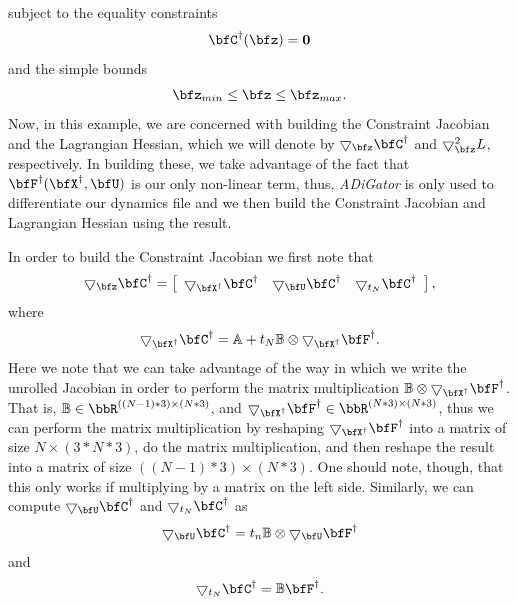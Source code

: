 \documentclass[10pt,pdftex]{article}
\begin{document}
subject to the equality constraints
\begin{equation}
\bfC^{\dag}(\bfz) = \bf0
\end{equation}
and the simple bounds
\begin{equation}
\bfz_{min} \leq \bfz \leq \bfz_{max}.
\end{equation}
Now, in this example, we are concerned with building the Constraint Jacobian and the Lagrangian Hessian, which we will denote by $\bigtriangledown _{\bfz} \bfC^{\dag}$ and $\bigtriangledown^2 _{\bfz} L$, respectively. In building these, we take advantage of the fact that $\bfF^{\dag}(\bfX^\dag,\bfU)$ is our only non-linear term, thus, \emph{ADiGator} is only used to differentiate our dynamics file and we then build the Constraint Jacobian and Lagrangian Hessian using the result.

In order to build the Constraint Jacobian we first note that
\begin{equation}
\bigtriangledown _{\bfz}\bfC^{\dag} = \left[
\begin{array}{ccc}
\bigtriangledown_{\bfX^{\dag}} \bfC^{\dag} & \bigtriangledown_{\bfU} \bfC^{\dag} & \bigtriangledown_{t_N} \bfC^{\dag} 
\end{array}
\right],
\end{equation}
where
\begin{equation}
\bigtriangledown_{\bfX^{\dag}} \bfC^{\dag} = \mathbb{A} + t_N \mathbb{B}\otimes \bigtriangledown_{\bfX^{\dag}} \bfF^{\dag}.
\end{equation}
Here we note that we can take advantage of the way in which we write the unrolled Jacobian in order to perform the matrix multiplication $\mathbb{B}\otimes \bigtriangledown_{\bfX^{\dag}} \bfF^{\dag}$. That is, $\mathbb{B} \in \bbR^{((N-1)*3) \times (N*3)}$, and $\bigtriangledown_{\bfX^{\dag}} \bfF^{\dag} \in \bbR^{(N*3) \times (N*3)}$, thus we can perform the matrix multiplication by reshaping $\bigtriangledown_{\bfX^{\dag}} \bfF^{\dag}$ into a matrix of size $N \times (3*N*3)$, do the matrix multiplication, and then reshape the result into a matrix of size $((N-1)*3) \times (N*3)$. One should note, though, that this only works if multiplying by a matrix on the left side. Similarly, we can compute $\bigtriangledown_{\bfU} \bfC^{\dag}$ and $\bigtriangledown_{t_N} \bfC^{\dag}$ as
\begin{equation}
\bigtriangledown_{\bfU} \bfC^{\dag} = t_n \mathbb{B}\otimes \bigtriangledown_{\bfU} \bfF^{\dag}
\end{equation}
and
\begin{equation}
\bigtriangledown_{t_N} \bfC^{\dag}  = \mathbb{B} \bfF^{\dag}.
\end{equation}
\end{document}
